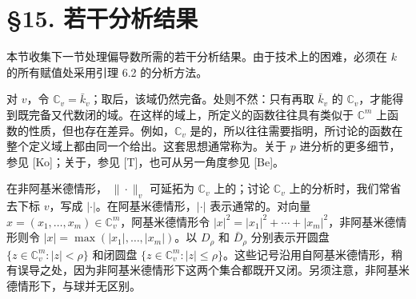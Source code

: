\section*{§15. 若干分析结果}
本节收集下一节处理偏导数所需的若干分析结果。由于技术上的困难，必须在 $k$ 的所有赋值处采用引理 6.2 的分析方法。

对 $v$，令 $\mathbb C_v=\bar k_v$；取后，该域仍然完备。处则不然：只有再取 $\bar k_v$ 的 $\mathbb C_v$，才能得到既完备又代数闭的域。在这样的域上，所定义的函数往往具有类似于 $\mathbb C^m$ 上函数的性质，但也存在差异。例如，$\mathbb C_v$ 是的，所以往往需要指明，所讨论的函数在整个定义域上都由同一个给出。这套思想通常称为。关于 $p$ 进分析的更多细节，参见 [Ko]；关于，参见 [T]，也可从另一角度参见 [Be]。

在非阿基米德情形， $\|\cdot\|_v$ 可延拓为 $\mathbb C_v$ 上的；讨论 $\mathbb C_v$ 上的分析时，我们常省去下标 $v$，写成 $|\cdot|$。在阿基米德情形，$|\cdot|$ 表示通常的。对向量 $x=(x_1,\ldots,x_m)\in\mathbb C_v^m$，阿基米德情形令 $|x|^2=|x_1|^2+\cdots+|x_m|^2$，非阿基米德情形则令 $|x|=\max(|x_1|,\ldots,|x_m|)$。以 $D_\rho$ 和 $\bar D_\rho$ 分别表示开圆盘 $\{z\in\mathbb C_v^m:|z|<\rho\}$ 和闭圆盘 $\{z\in\mathbb C_v^m:|z|\le\rho\}$。这些记号沿用自阿基米德情形，稍有误导之处，因为非阿基米德情形下这两个集合都既开又闭。另须注意，非阿基米德情形下，与球并无区别。

